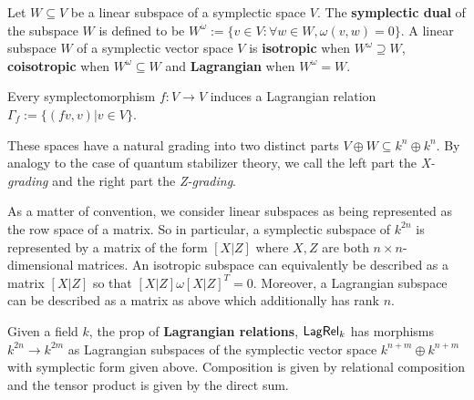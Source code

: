 \begin{definition}

Let $W \subseteq V$ be a linear subspace of a symplectic space $V$.
The {\bf symplectic dual} of the subspace $W$ is defined to be
$
W^\omega:= \{v \in V : \forall w \in W, \omega(v,w)=0 \}
$.
A linear subspace  $W$ of a symplectic vector space $V$ is {\bf isotropic} when $W^\omega \supseteq W$, {\bf coisotropic} when $W^\omega \subseteq W$ and {\bf Lagrangian} when $W^\omega=W$.


\end{definition}

\begin{lemma}
Every symplectomorphism $f:V\to V$ induces a Lagrangian relation $\Gamma_f:=\{ (fv, v) | v \in V \}$.
\end{lemma}

These spaces have a natural grading into two distinct parts $V \oplus W \subseteq k^n \oplus k^n$. By analogy to the case of quantum stabilizer theory, we call the left part the \textit{X-grading} and the right part the \textit{Z-grading}.

As a matter of convention, we consider linear subspaces as being represented as the row space of a matrix. So in particular, a symplectic subspace of $k^{2n}$ is represented by a matrix of the form $[X|Z]$ where $X,Z$ are both $n\times n$-dimensional matrices.
An isotropic subspace can equivalently be described as a matrix $[X|Z]$ so that $[X|Z] \omega [X|Z]^T = 0$.
Moreover, a Lagrangian subspace can be described as a matrix as above which additionally has rank $n$.


\begin{definition}
Given a field $k$, the prop of {\bf Lagrangian relations},  $\mathsf{Lag}\mathsf{Rel}_k$ has morphisms $k^{2n}\to k^{2m}$ as Lagrangian subspaces of the symplectic vector space $k^{n+m} \oplus k^{n+m}$ with symplectic form given above.  Composition is given by relational composition and the tensor product is given by the direct sum.
\end{definition}

